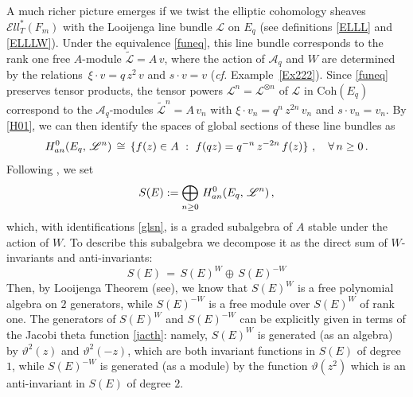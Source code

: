 \documentclass[11pt]{amsart}
\theoremstyle{definition}
\theoremstyle{remark}
\numberwithin{equation}{section}
\newcommand{\la}{\label}
\def\c{\mathbb{C}}
\def\A{\mathcal{A}}
\def\cL{\mathscr{
L}}
\def\Ell{\mathcal{E}{ll}}
\def\Coh{\mathrm{Coh}}
\begin{document}
A much richer picture emerges if we twist the elliptic cohomology sheaves $ \Ell_T^*(F_m) $ with 
the Looijenga line bundle $ \cL $ on $E_q$ (see definitions \eqref{ELLL} and \eqref{ELLLW}).
Under the equivalence \eqref{funeq}, this line bundle corresponds to the rank one free $A$-module $ \tilde{\cL} = A\,v $,  where the action of $\A_q$ and  $W$ are determined by the relations $\, \xi\cdot v = q\, z^2\, v$ and $ s \cdot v = v $ ({\it cf.} Example~\ref{Ex222}).
Since  \eqref{funeq} preserves tensor products, the tensor powers $\cL^n = \cL^{\otimes n} $ of $\cL$ in $ \Coh(E_q)$ correspond to the $\A_q$-modules $\widetilde{\cL}^n = A \,v_n$ with
$\xi \cdot v_n = q^n \,z^{2n}\,v_n$ and 
$ s \cdot v_n = v_n $.
By \eqref{H01}, we can then identify the spaces of global sections of these line bundles as
%
\begin{equation}\la{glsn}
H_{\rm an}^0(E_q,\,\cL^n)\,\cong\, 
\{f(z) \in A\ :\ f(qz) = q^{-n}\,z^{-2n}\,f(z)\}\ ,\quad \forall\,n \ge 0\,.
\end{equation}
%
Following \cite{Lo77}, we set
%
\begin{equation}\la{SE0}
S(E) := \bigoplus_{n \ge 0}\, H_{\rm an}^0(E_q,\,\cL^n) \,, 
\end{equation}
%
which, with identifications \eqref{glsn}, is a graded subalgebra of $A$ stable under the action of $W$. 
To describe this subalgebra we decompose it as the direct sum of $W$-invariants and anti-invariants:
%
\begin{equation}\la{SE}
 S(E) \,=\,S(E)^W \oplus\, S(E)^{-W}   
\end{equation}
%
Then, by Looijenga Theorem (see\cite[(3.4)]{Lo77}), we know that $ S(E)^W $ is a free polynomial algebra on $ 2 $ generators, while $ S(E)^{-W} $ is a free module over $S(E)^W$ of rank one.
The generators of $ S(E)^W $ and $S(E)^{-W}$ can be explicitly given in terms of the Jacobi theta function \eqref{jacth}: namely, $S(E)^W$  is generated (as an algebra) by  $ \vartheta^2(z) $ and $\vartheta^2(-z) $, which are both invariant functions in $S(E)$ of degree $1$, while $ S(E)^{-W}$ is generated (as a module) by the function $\vartheta(z^2) $ which is an anti-invariant in $ S(E)$ of degree $2$. %
%
\end{document}
